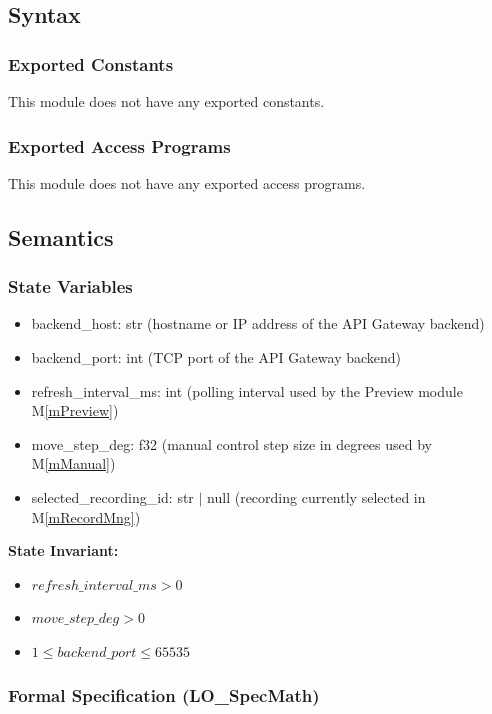 \documentclass[12pt, titlepage]{article}
\newcommand{\mref}[1]{M\ref{#1}}
\begin{document}
\subsection{Syntax}

\subsubsection{Exported Constants}

This module does not have any exported constants.

\subsubsection{Exported Access Programs}

This module does not have any exported access programs.

\subsection{Semantics}

\subsubsection{State Variables}

\begin{itemize}
  \item backend\_host: str (hostname or IP address of the API Gateway backend)
  \item backend\_port: int (TCP port of the API Gateway backend)
  \item refresh\_interval\_ms: int (polling interval used by the Preview module
        \mref{mPreview})
  \item move\_step\_deg: f32 (manual control step size in degrees used by
        \mref{mManual})
  \item selected\_recording\_id: str $|$ null (recording currently selected in
        \mref{mRecordMng})
\end{itemize}

\noindent \textbf{State Invariant:}
\begin{itemize}
  \item $refresh\_interval\_ms > 0$
  \item $move\_step\_deg > 0$
  \item $1 \le backend\_port \le 65535$
\end{itemize}

\subsubsection{Formal Specification (LO\_SpecMath)}
\end{document}
